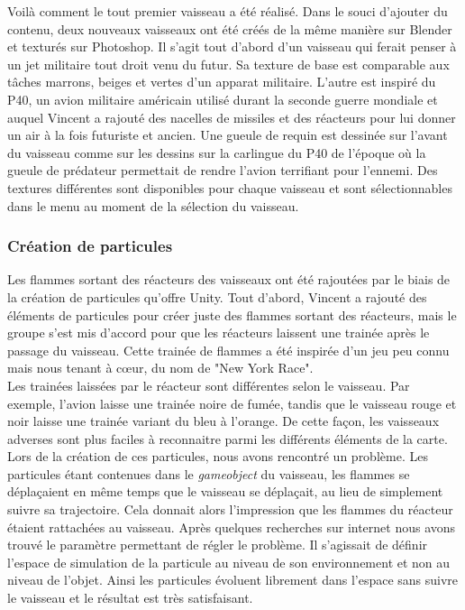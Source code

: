 \documentclass[12pt, titlepage]{article}
\begin{document}
\begin{spacing}{1.5}
Voilà comment le tout premier vaisseau a été réalisé. Dans le souci d'ajouter du contenu, deux nouveaux vaisseaux ont été créés de la même manière sur Blender et texturés sur Photoshop. Il s'agit tout d'abord d'un vaisseau qui ferait penser à un jet militaire tout droit venu du futur. Sa texture de base est comparable aux tâches marrons, beiges et vertes d’un apparat militaire. L'autre est inspiré du P40, un avion militaire américain utilisé durant la seconde guerre mondiale et auquel Vincent a rajouté des nacelles de missiles et des réacteurs pour lui donner un air à la fois futuriste et ancien. Une gueule de requin est dessinée sur l’avant du vaisseau comme sur les dessins sur la carlingue du P40 de l’époque où la gueule de prédateur permettait de rendre l’avion terrifiant pour l’ennemi.
Des textures différentes sont disponibles pour chaque vaisseau et sont sélectionnables dans le menu au moment de la sélection du vaisseau.\\

\subsubsection{Création de particules}

Les flammes sortant des réacteurs des vaisseaux ont été rajoutées par le biais de la création de particules qu'offre Unity. Tout d'abord, Vincent a rajouté des éléments de particules pour créer juste des flammes sortant des réacteurs, mais le groupe s'est mis d'accord pour que les réacteurs laissent une trainée après le passage du vaisseau. Cette trainée de flammes a été inspirée d’un jeu peu connu mais nous tenant à cœur, du nom de "New York Race". \\

Les trainées laissées par le réacteur sont différentes selon le vaisseau. Par exemple, l'avion laisse une trainée noire de fumée, tandis que le vaisseau rouge et noir laisse une trainée variant du bleu à l’orange. De cette façon, les vaisseaux adverses sont plus faciles à reconnaitre parmi les différents éléments de la carte. \\

Lors de la création de ces particules, nous avons rencontré un problème. Les particules étant contenues dans le \textit{gameobject} du vaisseau, les flammes se déplaçaient en même temps que le vaisseau se déplaçait, au lieu de simplement suivre sa trajectoire. Cela donnait alors l’impression que les flammes du réacteur étaient rattachées au vaisseau. Après quelques recherches sur internet nous avons trouvé le paramètre permettant de régler le problème. Il s'agissait de définir l'espace de simulation de la particule au niveau de son environnement et non au niveau de l'objet. Ainsi les particules évoluent librement dans l’espace sans suivre le vaisseau et le résultat est très satisfaisant.\\


\end{spacing}
\end{document}
